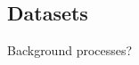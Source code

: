 %

%

\subsection*{Datasets}
%

\begin{frame}
\begin{center}
\LARGE Background processes?
\end{center}
\end{frame}



%

